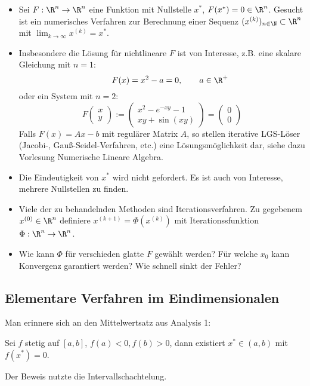 \documentclass[11pt]{scrartcl}
\begin{document}
\begin{itemize}
	\item
		Sei $F:\R^n \to \R^n$ eine Funktion mit Nullstelle $x^*$, $F(x^*) = 0 \in \R^n$.
		Gesucht ist ein numerisches Verfahren zur Berechnung einer Sequenz $(x^{(k)})_{n\in \N} \subset \R^n$ mit $\lim_{k\to \infty} x^{(k)} = x^*$.
	\item
		Insbesondere die Lösung für nichtlineare $F$ ist von Interesse, z.B. eine skalare Gleichung mit $n=1$:
		\[
			\qquad F(x) = x^2 - a = 0, \qquad a\in \R^+
		\]
		oder ein System mit $n=2$:
		\[
			F \begin{pmatrix}
				x \\ y
			\end{pmatrix}
			:= \begin{pmatrix}
				x^2 - e^{-xy} - 1 \\
				xy + \sin(xy)
			\end{pmatrix}
			= \begin{pmatrix}
				0 \\ 0
			\end{pmatrix}
		\]
		Falls $F(x) = Ax - b$ mit regulärer Matrix $A$, so stellen iterative LGS-Löser (Jacobi-, Gauß-Seidel-Verfahren, etc.) eine Lösungsmöglichkeit dar, siehe dazu Vorlesung Numerische Lineare Algebra.
	\item
		Die Eindeutigkeit von $x^*$ wird nicht gefordert. 
		Es ist auch von Interesse, mehrere Nullstellen zu finden.
	\item
		Viele der zu behandelnden Methoden sind Iterationsverfahren.
		Zu gegebenem $x^{(0)} \in \R^n$ definiere $x^{(k+1)} = \Phi(x^{(k)})$ mit Iterationssfunktion $\Phi : \R^n \to \R^n$.
	\item
		Wie kann $\Phi$ für verschieden glatte $F$ gewählt werden?
		Für welche $x_0$ kann Konvergenz garantiert werden?
		Wie schnell sinkt der Fehler?
\end{itemize}


\subsection{Elementare Verfahren im Eindimensionalen}


Man erinnere sich an den Mittelwertsatz aus Analysis 1:

Sei $f$ stetig auf $[a,b]$, $f(a) < 0, f(b) > 0$, dann existiert $x^* \in (a,b)$ mit $f(x^*)=0$.

Der Beweis nutzte die Intervallschachtelung.
\end{document}
